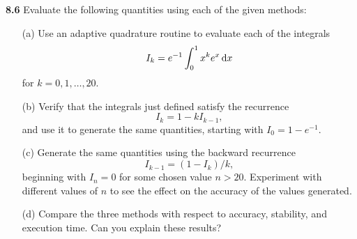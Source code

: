 \textbf{8.6}
Evaluate the following quantities using each of the given methods:
\begin{itemize}
\item[(a)]
  Use an adaptive quadrature routine to evaluate each of the integrals
  \begin{displaymath}
    I_k = e^{-1}\int_0^1x^ke^x\,\mathrm{d} x
  \end{displaymath}
  for $k=0, 1, \ldots, 20$.

\item[(b)]
  Verify that the integrals just defined satisfy the recurrence
  \begin{displaymath}
    I_k = 1 - kI_{k-1},
  \end{displaymath}
  and use it to generate the same quantities,
  starting with $I_0=1-e^{-1}$.

\item[(c)]
  Generate the same quantities using the backward recurrence
  \begin{displaymath}
    I_{k-1} = (1-I_k)/k,
  \end{displaymath}
  beginning with $I_n=0$ for some chosen value $n>20$.
  Experiment with different values of $n$ to see the effect
  on the accuracy of the values generated.

\item[(d)]
  Compare the three methods with respect to accuracy,
  stability,
  and execution time.
  Can you explain these results?
\end{itemize}
